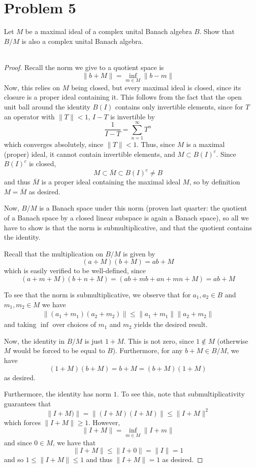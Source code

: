 \documentclass[fontsize=11pt]{scrartcl} %
\numberwithin{equation}{section} %
\numberwithin{figure}{section} %
\numberwithin{table}{section} %
\begin{document}
\section*{Problem 5}
Let $M$ be a maximal ideal of a complex unital Banach algebra $B$. Show that
$B/{M}$ is also a complex unital Banach algebra.
\\
\\
\begin{proof}
    Recall the norm we give to a quotient space is
    \[
        \|b + M\| = \inf_{m\in M}\|b-m\|
    \]
    Now, this relies on $M$ being closed, but every maximal ideal is closed,
    since its closure is a proper ideal containing it. This follows from the
    fact that the open unit ball around the identity $B(I)$ contains only invertible
    elements, since for $T$ an operator with $\|T\|<1$, $I-T$ is invertible by
    \[
        \frac{1}{I-T} = \sum_{n=1}^{\infty}T^n
    \]
    which converges absolutely, since $\|T\|<1$. Thus, since $M$ is a maximal
    (proper) ideal, it cannot contain invertible elements, and $M\subset
    B(I)^c$. Since $B(I)^c$ is closed,
    \[
        M\subset \overline{M}\subset B(I)^c\neq B
    \]
    and thus $\overline{M}$ is a proper ideal containing the maximal ideal $M$,
    so by definition $M=\overline{M}$ as desired.

    Now, $B/{M}$ is a Banach space under this norm (proven last quarter: the
        quotient of a Banach space by a closed linear subspace is again a Banach
    space), so all we have to show is that the norm is submultiplicative, and
    that the quotient contains the identity. 

    Recall that the multiplication on $B/{M}$ is given by
    \[
        (a+M)(b+M) = ab+M
    \]
which is easily verified to be well-defined, since 
\[
    (a+m+M)(b+n+M) = (ab + mb + an+mn +M) = ab+M
\]

    To see that the norm is submultiplicative, we observe that for $a_1,a_2\in
    B$ and $m_1,m_2\in M$ we have
    \[
        \begin{aligned}
            \|(a_1+m_1)(a_2+m_2)\|\leq \|a_1+m_1\|\|a_2+m_2\|
        \end{aligned}
    \]
    and taking $\inf$ over choices of $m_1$ and $m_2$ yields the desired result.

    Now, the identity in $B/{M}$ is just $1+M$. This is not zero, since
    $1\not\in M$ (otherwise $M$ would be forced to be equal to $B$).
    Furthermore, for any $b+M\in B/{M}$, we have
    \[
        (1+M)(b+M) = b+M = (b+M)(1+M)
    \]
    as desired.

    Furthermore, the identity has norm $1$. To see this, note that
    submultiplicativity guarantees that
    \[
        \|I+M)\| = \|(I+M)(I+M)\| \leq \|I+M\|^2
    \]
    which forces $\|I+M\|\geq 1$. However,
    \[
        \|I+M\| = \inf_{m\in M}\|I+m\|
    \]
    and since $0\in M$, we have that
    \[
        \|I+M\| \leq \|I+0\| = \|I\| = 1
    \]
    and so $1\leq \|I+M\|\leq 1$ and thus $\|I+M\|=1$ as desired.

\end{proof}
\end{document}
